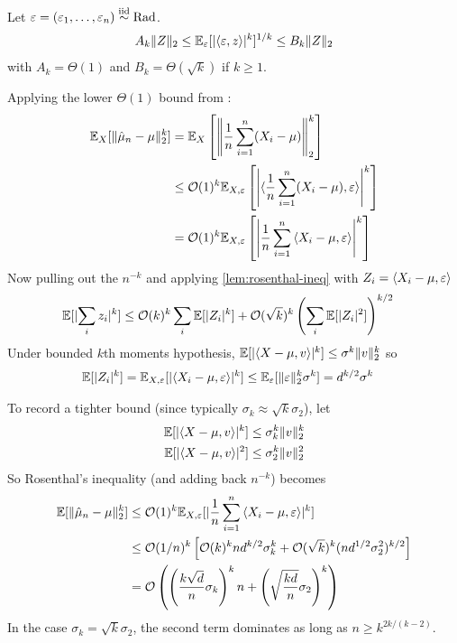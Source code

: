 \begin{lemma}\label{lem:khintchine}
  Let $\varepsilon = (\varepsilon_1, \ldots, \varepsilon_n) \overset{\text{iid}}{\sim} \text{Rad}$.
  \begin{align}
    A_k \|Z\|_2 \leq \mathbb{E}_\varepsilon[\lvert \braket{\varepsilon,z}\rvert^k]^{1/k} \leq B_k \|Z\|_2
  \end{align}
  with $A_k = \Theta(1)$ and $B_k = \Theta(\sqrt{k})$ if $k \geq 1$.
\end{lemma}

Applying the lower $\Theta(1)$ bound from :
\begin{align}
  \mathbb{E}_X [ \|\hat{\mu}_n - \mu\|_2^k ]
  &= \mathbb{E}_X \left[ \left\| \frac{1}{n} \sum_{i=1}^n (X_i - \mu)\right\|_2^k \right] \\
  &\leq \mathcal{O}(1)^k \mathbb{E}_{X,\varepsilon} \left[ \left\lvert \braket{\frac{1}{n} \sum_{i=1}^n (X_i - \mu), \varepsilon} \right\rvert^k \right] \\
  &= \mathcal{O}(1)^k \mathbb{E}_{X, \varepsilon}\left[
    \left\lvert
      \frac{1}{n} \sum^{n}_{i=1} \braket{X_i - \mu, \varepsilon}
    \right\rvert^k
  \right]
\end{align}
Now pulling out the $n^{-k}$ and applying \ref{lem:rosenthal-ineq}
with $Z_i = \braket{X_i - \mu, \varepsilon}$
\begin{align}
  \mathbb{E}[\lvert \sum_i z_i \rvert^k]
  &\leq \mathcal{O}(k)^k \sum_i \mathbb{E}[\lvert Z_i \rvert^k]
  + \mathcal{O}(\sqrt{k})^k \left(\sum_i \mathbb{E}[\lvert Z_i \rvert^2]\right)^{k/2}
\end{align}
Under bounded $k$th moments hypothesis, $\mathbb{E}[\lvert \braket{X - \mu,
v}\rvert^k] \leq \sigma^k \|v\|_2^k$ so
\begin{align}
  \mathbb{E}[\lvert Z_i \rvert^k]
  &= \mathbb{E}_{X,\varepsilon}[\lvert \braket{X_i - \mu, \varepsilon}\rvert^k]
  \leq \mathbb{E}_\varepsilon[\|\varepsilon\|_2^k \sigma^k]
  = d^{k/2} \sigma^k
\end{align}

To record a tighter bound (since typically $\sigma_k \approx \sqrt{k} \sigma_2$),
let
\begin{align}
  \mathbb{E}[\lvert \braket{X - \mu, v}\rvert^k]
  &\leq \sigma_k^k \|v\|_2^k \\
  \mathbb{E}[\lvert \braket{X - \mu, v}\rvert^2]
  &\leq \sigma_2^k \|v\|_2^2
\end{align}
So Rosenthal's inequality (and adding back $n^{-k}$) becomes
\begin{align}
  \mathbb{E}[\|\hat{\mu}_n - \mu\|_2^k]
  &\leq \mathcal{O}(1)^k \mathbb{E}_{X, \varepsilon}[\lvert \frac{1}{n} \sum^{n}_{i=1} \braket{X_i - \mu, \varepsilon}\rvert^k] \\
  &\leq \mathcal{O}(1/n)^k \left[
    \mathcal{O}(k)^k n d^{k/2} \sigma_k^k + \mathcal{O}(\sqrt{k})^k (n d^{1/2} \sigma_2^2)^{k/2}
  \right] \\
  &= \mathcal{O}\left(
    \left( \frac{k \sqrt{d}}{n} \sigma_k\right)^k n
    + \left(\sqrt{\frac{k d}{n}}\sigma_2 \right)^k
  \right)
\end{align}
In the case $\sigma_k = \sqrt{k} \sigma_2$, the second term dominates as long
as $n \geq k^{2k / (k-2)}$.

